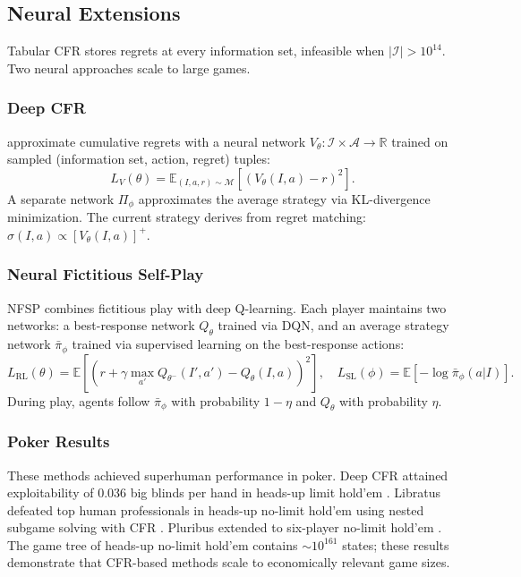 \subsection{Neural Extensions}

Tabular CFR stores regrets at every information set, infeasible when $|\mathcal{I}| > 10^{14}$. Two neural approaches scale to large games.

\subsubsection{Deep CFR}

\citet{Brown2019} approximate cumulative regrets with a neural network $V_\theta: \mathcal{I} \times \mathcal{A} \to \mathbb{R}$ trained on sampled (information set, action, regret) tuples:
\begin{equation}
L_V(\theta) = \mathbb{E}_{(I, a, r) \sim \mathcal{M}} \left[ (V_\theta(I, a) - r)^2 \right].
\end{equation}
A separate network $\Pi_\phi$ approximates the average strategy via KL-divergence minimization. The current strategy derives from regret matching: $\sigma(I, a) \propto [V_\theta(I, a)]^+$.

\subsubsection{Neural Fictitious Self-Play}

NFSP \citep{heinrich2016deep} combines fictitious play \citep{Brown1951} with deep Q-learning. Each player maintains two networks: a best-response network $Q_\theta$ trained via DQN, and an average strategy network $\bar{\pi}_\phi$ trained via supervised learning on the best-response actions:
\begin{equation}
L_{\text{RL}}(\theta) = \mathbb{E}\left[ \left( r + \gamma \max_{a'} Q_{\theta^-}(I', a') - Q_\theta(I, a) \right)^2 \right], \quad
L_{\text{SL}}(\phi) = \mathbb{E}\left[ -\log \bar{\pi}_\phi(a | I) \right].
\end{equation}
During play, agents follow $\bar{\pi}_\phi$ with probability $1-\eta$ and $Q_\theta$ with probability $\eta$.

\subsubsection{Poker Results}

These methods achieved superhuman performance in poker. Deep CFR attained exploitability of 0.036 big blinds per hand in heads-up limit hold'em \citep{Brown2019}. Libratus defeated top human professionals in heads-up no-limit hold'em using nested subgame solving with CFR \citep{brown2017superhuman}. Pluribus extended to six-player no-limit hold'em \citep{brown2019superhuman}. The game tree of heads-up no-limit hold'em contains $\sim 10^{161}$ states; these results demonstrate that CFR-based methods scale to economically relevant game sizes.


